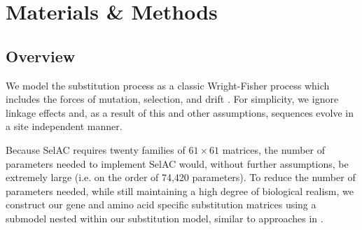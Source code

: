 \documentclass[onecolumn,letterpaper,fleqn,nogrid]{myMBE}%
\newcommand{\selac}{SelAC\xspace}
\begin{document}
\section{Materials \& Methods} %
\subsection{Overview}
We model the substitution process as a classic Wright-Fisher process which includes the forces of mutation, selection, and drift \citep{Fisher1930,Kimura1962,Wright1969,Iwasa1988,BergAndLassig2003,SellaAndHirsh2005,McCandlishAndStoltzfus2014}.
For simplicity, we ignore linkage effects and, as a result of this and other assumptions, sequences evolve in a site independent manner.

Because \selac requires twenty families of $61 \times 61$ matrices, the number of parameters needed to implement \selac would, without further assumptions, be extremely large (i.e. on the order of 74,420 parameters).
To reduce the number of parameters needed, while still maintaining a high degree of biological realism, we construct our gene and amino acid specific substitution matrices using a submodel nested within our substitution model, similar to approaches in \citet{Gilchrist2007,ShahAndGilchrist2011,GilchristEtAl2015}.
\end{document}
